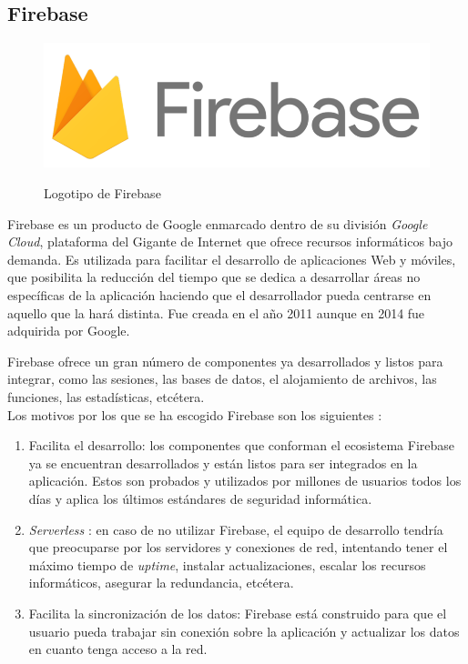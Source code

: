 \documentclass[twoside]{report}
\begin{document}
\subsection{Firebase}
\label{firebase}

\begin{figure}[H]
\centering
\includegraphics[scale=0.3]{images/firebase}\\
\caption{Logotipo de Firebase} \cite{firebase}
\end{figure}


Firebase es un producto de Google enmarcado dentro de su división \textit{Google Cloud}, plataforma del Gigante de Internet que ofrece recursos informáticos bajo demanda. Es utilizada para facilitar el desarrollo de aplicaciones Web y móviles, que posibilita la reducción del tiempo que se dedica a desarrollar áreas no específicas de la aplicación haciendo que el desarrollador pueda centrarse en aquello que la hará distinta. Fue creada en el año 2011 aunque en 2014 fue adquirida por Google.

Firebase ofrece un gran número de componentes ya desarrollados y listos para integrar, como las sesiones, las bases de datos, el alojamiento de archivos, las funciones, las estadísticas, etcétera.\\

Los motivos por los que se ha escogido Firebase son los siguientes \cite{firebaseadvdis}:

\begin{enumerate}

\item Facilita el desarrollo: los componentes que conforman el ecosistema Firebase ya se encuentran desarrollados y están listos para ser integrados en la aplicación. Estos son probados y utilizados por millones de usuarios todos los días y aplica los últimos estándares de seguridad informática.

\item \textit{Serverless} : en caso de no utilizar Firebase, el equipo de desarrollo tendría que preocuparse por los servidores y conexiones de red, intentando tener el máximo tiempo de \textit{uptime}, instalar actualizaciones, escalar  los recursos informáticos, asegurar la redundancia, etcétera.

\item Facilita la sincronización de los datos: Firebase está construido para que el usuario pueda trabajar sin conexión sobre la aplicación y actualizar los datos en cuanto tenga acceso a la red.
\end{enumerate}
\end{document}
